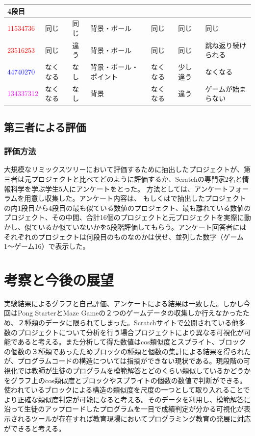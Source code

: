 \documentclass[a4paper,10pt,onecolumn,oneside,openany]{jsbook}
\begin{document}
\begin{table}[h]
\begin{center}
\begin{tabular}{|p{1.7cm}||p{1cm}|p{1cm}|p{1.7cm}|p{2cm}|p{1cm}|p{1.7cm}|}
4段目 &  &  &  &  &  &  \\ \hline
\textcolor{red}{11534736} & 同じ & 同じ & 背景・ボール & 同じ & 同じ & 同じ \\ \hline
\textcolor{red}{23516253} & 同じ & 違う & 背景・ボール & 同じ & 同じ & 跳ね返り続けられる \\ \hline
\textcolor{blue}{44740270} & なくなる & なし & 背景・ボール・ポイント & なくなる & 少し違う & なくなる \\ \hline
\textcolor{magenta}{134337312} & なくなる & なし & 背景 & なくなる & 違う & ゲームが始まらない \\ \hline

\end{tabular}
\end{center}
\end{table}

\newpage
\section{第三者による評価}
\subsection{評価方法}
大規模なリミックスツリーにおいて評価するために抽出したプロジェクトが、第三者は元プロジェクトと比べてどのように評価するか、Scratchの専門家2名と情報科学を学ぶ学生5人にアンケートをとった。
方法としては、アンケートフォーラムを用意し収集した。アンケート内容は、  \label{block}もしくは\label{splite}で抽出したプロジェクトの内1段目から4段目の最も似ている数値のプロジェクト、最も離れている数値のプロジェクト、その中間、合計16個のプロジェクトと元プロジェクトを実際に動かし、似ているか似ていないかを5段階評価してもらう。アンケート回答者にはそれぞれのプロジェクトは何段目のものなのかは伏せ、並列した数字（ゲーム1〜ゲーム16）で表示した。




\chapter{考察と今後の展望}
実験結果によるグラフと自己評価、アンケートによる結果は一致した。しかし今回はPong StarterとMaze Gameの２つのゲームデータの収集しか行えなかったため、２種類のデータに限られてしまった。Scratchサイトで公開されている他多数のプロジェクトについて分析を行う場合プロジェクトにより異なる可視化が可能であると考える。また分析して得た数値はcos類似度とスプライト、ブロックの個数の３種類であったためブロックの種類と個数の集計による結果を得られたが、プログラムコードの構造については指摘ができない現状である。現段階の可視化では教師が生徒のプログラムを模範解答とどのくらい類似しているかどうかをグラフ上のcos類似度とブロックやスプライトの個数の数値で判断ができる。使われているブロックによる構造の類似度を尺度の一つとして取り入れることでより正確な類似度判定が可能になると考える。そのデータを利用し、模範解答に沿って生徒のアップロードしたプログラムを一目で成績判定が分かる可視化が表示されるツールが存在すれば教育現場においてプログラミング教育の発展に対応ができると考える。
\end{document}
